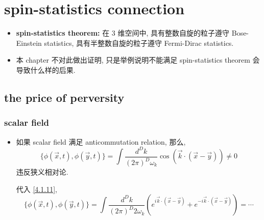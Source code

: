 \chapter{spin-statistics connection}
\begin{itemize}
	\item \textbf{spin-statistics theorem:} 在 3 维空间中, 具有整数自旋的粒子遵守 Bose-Einstein statistics, 具有半整数自旋的粒子遵守 Fermi-Dirac statistics.
	
	\item 本 chapter 不对此做出证明, 只是举例说明不能满足 spin-statistics theorem 会导致什么样的后果.
\end{itemize}

\section{the price of perversity}
\subsection{scalar field}
\begin{itemize}
	\item 如果 scalar field 满足 anticommutation relation, 那么,
	\begin{equation}
		\{\phi(\vec{x}, t), \phi(\vec{y}, t)\} = \int \frac{d^D k}{(2 \pi)^D \omega_k} \cos(\vec{k} \cdot (\vec{x} - \vec{y})) \neq 0
	\end{equation}
	违反狭义相对论.
	
	\begin{tcolorbox}[title=calculation:]
		代入 \eqref{4.1.11},
		\begin{equation}
			\{\phi(\vec{x}, t), \phi(\vec{y}, t)\} = \int \frac{d^D k}{(2 \pi)^D 2 \omega_k} (e^{i \vec{k} \cdot (\vec{x} - \vec{y})} + e^{- i \vec{k} \cdot (\vec{x} - \vec{y})}) = \cdots
		\end{equation}
	\end{tcolorbox}
\end{itemize}

